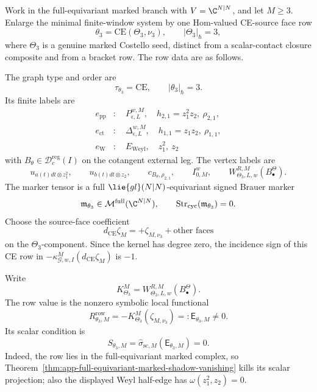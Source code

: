 \begin{prop}\label{prop:concrete-order-three-enlarged-system-row}
  Work in the full-equivariant marked branch with \(V=\C^{N|N}\), and let
  \(M\geq3\).  Enlarge the minimal finite-window system by one Hom-valued
  CE-source face row
  \[
    \theta_3=\mathrm{CE}(\Theta_3,\nu_3),
    \qquad |\Theta_3|_\hbar=3,
  \]
  where \(\Theta_3\) is a genuine marked Costello seed, distinct from a
  scalar-contact closure composite and from a bracket row.  The row data are
  as follows.

  The graph type and order are
  \[
    \tau_{\theta_3}=\mathrm{CE},\qquad |\theta_3|_\hbar=3.
  \]
  Its finite labels are
  \[
  \begin{aligned}
    e_{\mathrm{pp}}&:\quad
      P_{\epsilon,L}^{w,M},\quad
      h_{2,1}=z_1^2z_2,\ \rho_{2,1},\\
    e_{\mathrm{ct}}&:\quad
      \Delta_{\epsilon,L}^{w,M},\quad
      h_{1,1}=z_1z_2,\ \rho_{1,1},\\
    e_{\mathrm{W}}&:\quad
      E_{\mathrm{Weyl}},\quad
      z_1^2,\ z_2
  \end{aligned}
  \]
  with \(B_\theta\in\mathcal D^{\mathrm{reg}}_c(I)\) on the cotangent
  external leg.  The vertex labels are
  \[
    u_{a(t)dt\otimes z_1^2},\qquad
    u_{b(t)dt\otimes z_2},\qquad
    c_{B_\theta,\rho_{2,1}},\qquad
    I^w_{0,M},\qquad
    W^{R,M}_{\Theta_3,L,w}(B^\Theta_\bullet).
  \]
  The marker tensor is a full
  \(\lie{gl}(N|N)\)-equivariant signed Brauer marker
  \[
    \mathfrak m_{\theta_3}\in
    \mathcal M^{\mathrm{full}}(\C^{N|N}),
    \qquad
    \operatorname{Str}_{\mathrm{cyc}}(\mathfrak m_{\theta_3})=0.
  \]
  Choose the source-face coefficient
  \[
    d_{\mathrm{CE}}\zeta_M
      =
    +\zeta_{M,\nu_3}+\text{other faces}
  \]
  on the \(\Theta_3\)-component.  Since the kernel has degree zero, the
  incidence sign of this CE row in
  \(-\kappa^M_{\mathcal G,w,I}(d_{\mathrm{CE}}\zeta_M)\) is \(-1\).

  Write
  \[
    K^M_{\Theta_3}
      =
    W^{R,M}_{\Theta_3,L,w}(B^\Theta_\bullet).
  \]
  The row value is the nonzero symbolic local functional
  \[
    R^{\mathrm{row}}_{\theta_3,M}
      =
    -K^M_{\Theta_3}(\zeta_{M,\nu_3})
      =:\mathsf E_{\theta_3,M}\neq0.
  \]
  Its scalar condition is
  \[
    S_{\theta_3,M}
      =
    \widehat\sigma_{\mathrm{sc},M}(\mathsf E_{\theta_3,M})=0.
  \]
  Indeed, the row lies in the full-equivariant marked complex, so
  Theorem~\ref{thm:app-full-equivariant-marked-shadow-vanishing} kills its
  scalar projection; also the displayed Weyl half-edge has
  \(\omega(z_1^2,z_2)=0\).


\end{prop}
